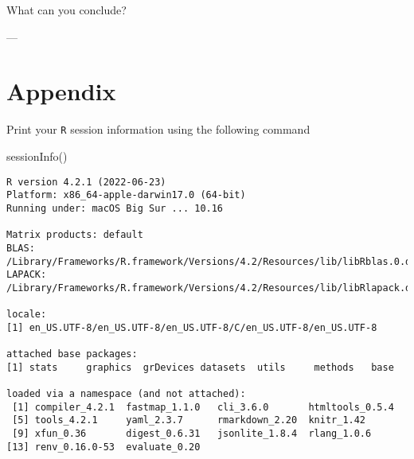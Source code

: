 \documentclass[
  letterpaper,
  DIV=11,
  numbers=noendperiod]{scrartcl}
\newenvironment{Shaded}{\begin{snugshade}}{\end{snugshade}}
\newcommand{\FunctionTok}[1]{\textcolor[rgb]{0.28,0.35,0.67}{#1}}
\newcommand{\NormalTok}[1]{\textcolor[rgb]{0.00,0.23,0.31}{#1}}
\begin{document}
What can you conclude?

---

\hypertarget{appendix}{%
\section{Appendix}\label{appendix}}

Print your \texttt{R} session information using the following command

\begin{Shaded}
\begin{Highlighting}[]
\FunctionTok{sessionInfo}\NormalTok{()}
\end{Highlighting}
\end{Shaded}

\begin{verbatim}
R version 4.2.1 (2022-06-23)
Platform: x86_64-apple-darwin17.0 (64-bit)
Running under: macOS Big Sur ... 10.16

Matrix products: default
BLAS:   /Library/Frameworks/R.framework/Versions/4.2/Resources/lib/libRblas.0.dylib
LAPACK: /Library/Frameworks/R.framework/Versions/4.2/Resources/lib/libRlapack.dylib

locale:
[1] en_US.UTF-8/en_US.UTF-8/en_US.UTF-8/C/en_US.UTF-8/en_US.UTF-8

attached base packages:
[1] stats     graphics  grDevices datasets  utils     methods   base     

loaded via a namespace (and not attached):
 [1] compiler_4.2.1  fastmap_1.1.0   cli_3.6.0       htmltools_0.5.4
 [5] tools_4.2.1     yaml_2.3.7      rmarkdown_2.20  knitr_1.42     
 [9] xfun_0.36       digest_0.6.31   jsonlite_1.8.4  rlang_1.0.6    
[13] renv_0.16.0-53  evaluate_0.20  
\end{verbatim}
\end{document}
